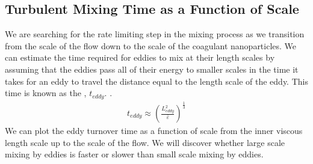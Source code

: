 \documentclass[letterpaper,10pt,english]{sphinxmanual}
\begin{document}
\subsection{Turbulent Mixing Time as a Function of Scale}
\label{\detokenize{Rapid_Mix/RM_Theory_and_Future_Work:turbulent-mixing-time-as-a-function-of-scale}}\label{\detokenize{Rapid_Mix/RM_Theory_and_Future_Work:heading-mixing-time-as-a-function-of-scale}}
We are searching for the rate limiting step in the mixing process as we transition from the scale of the flow down to the scale of the coagulant nanoparticles. We can estimate the time required for eddies to mix at their length scales by assuming that the eddies pass all of their energy to smaller scales in the time it takes for an eddy to travel the distance equal to the length scale of the eddy. This time is known as the ,
\(t_{eddy}\). {\hyperref[\detokenize{Rapid_Mix/RM_Derivations:heading-eddy-turnover-time}]{}}.
\begin{equation}\label{equation:Rapid_Mix/RM_Theory_and_Future_Work:Rapid_Mix/RM_Theory_and_Future_Work:20}
\begin{split}t_{eddy} \approx \left( \frac{L_{eddy}^2}{ \bar\varepsilon }\right)^\frac{1}{3}\end{split}
\end{equation}
We can plot the eddy turnover time as a function of scale from the inner viscous length scale up to the scale of the flow. We will discover whether large scale mixing by eddies is faster or slower than small scale mixing by eddies.
\end{document}
